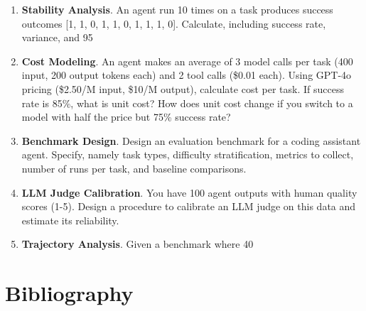 \begin{enumerate}
\item \textbf{Stability Analysis}. An agent run 10 times on a task produces success outcomes [1, 1, 0, 1, 1, 0, 1, 1, 1, 0]. Calculate, including success rate, variance, and 95%

\item \textbf{Cost Modeling}. An agent makes an average of 3 model calls per task (400 input, 200 output tokens each) and 2 tool calls (\$0.01 each). Using GPT-4o pricing (\$2.50/M input, \$10/M output), calculate cost per task. If success rate is 85\%, what is unit cost? How does unit cost change if you switch to a model with half the price but 75\% success rate?

\item \textbf{Benchmark Design}. Design an evaluation benchmark for a coding assistant agent. Specify, namely task types, difficulty stratification, metrics to collect, number of runs per task, and baseline comparisons.

\item \textbf{LLM Judge Calibration}. You have 100 agent outputs with human quality scores (1-5). Design a procedure to calibrate an LLM judge on this data and estimate its reliability.

\item \textbf{Trajectory Analysis}. Given a benchmark where 40%
\end{enumerate}

\section*{Bibliography}

